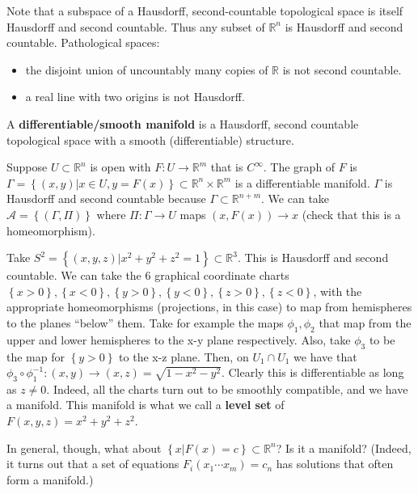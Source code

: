 \documentclass{mathnotes}
\begin{document}
Note that a subspace of a Hausdorff, second-countable topological space is itself Hausdorff and second countable. Thus any subset of $\mathbb{R}^n$ is
Hausdorff and second countable. Pathological spaces:
\begin{itemize}
    \item the disjoint union of uncountably many copies of $\mathbb{R}$ is not second countable.
    \item a real line with two origins is not Hausdorff.
\end{itemize}

\begin{defn}
    A \textbf{differentiable/smooth manifold} is a Hausdorff, second countable topological space with a smooth (differentiable) structure.
\end{defn}

\begin{exmp}
    Suppose $U\subset\mathbb{R}^n$ is open with $F:U\to\mathbb{R}^m$ that is $C^\infty$. The graph of $F$ is
    $\Gamma=\left\{ (x,y) | x\in U, y=F(x) \right\}\subset\mathbb{R}^n\times\mathbb{R}^m$
    is a differentiable manifold. $\Gamma$ is Hausdorff and second countable because $\Gamma\subset\mathbb{R}^{n+m}$. We can take $\mathcal{A}=\left\{ (\Gamma, \Pi) \right\}$
    where $\Pi:\Gamma\to U$ maps $(x,F(x))\to x$ (check that this is a homeomorphism).
\end{exmp}

\begin{exmp}
    Take $S^2=\left\{ (x,y,z) | x^2+y^2+z^2=1 \right\}\subset\mathbb{R}^3$. This is Hausdorff and second countable. We can take the 6 graphical coordinate charts
    $\left\{ x>0 \right\},\left\{ x<0 \right\},\left\{ y>0 \right\},\left\{ y<0 \right\},\left\{ z>0 \right\},\left\{ z<0 \right\}$, with the appropriate homeomorphisms
    (projections, in this case) to map from hemispheres to the planes ``below'' them. Take for example the maps $\phi_1,\phi_2$ that map from the upper and lower hemispheres
    to the x-y plane respectively. Also, take $\phi_3$ to be the map for $\left\{ y>0 \right\}$ to the x-z plane. Then, on $U_1\cap U_1$ we have that
    $\phi_3\circ\phi_1^{-1}:(x,y)\to(x,z)=\sqrt{1-x^2-y^2}$. Clearly this is differentiable as long as $z\neq0$. Indeed, all the charts turn out to be smoothly compatible, and
    we have a manifold. This manifold is what we call a \textbf{level set} of $F(x,y,z)=x^2+y^2+z^2$.
\end{exmp}

In general, though, what about $\left\{ x | F(x)=c \right\}\subset \mathbb{R}^n$? Is it a manifold? (Indeed, it turns out that a set of equations $F_i(x_1\cdots x_m)=c_n$
has solutions that often form a manifold.)
\end{document}
